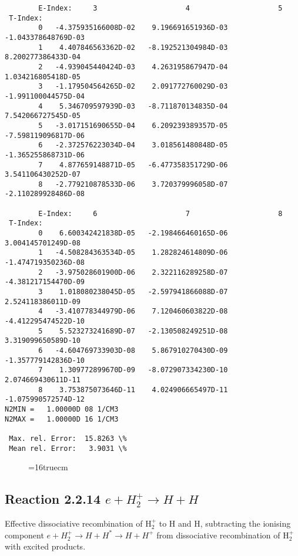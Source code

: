 \documentclass[12pt,dvipdfmx]{article}
\begin{document}
{\begin{small}
\begin{verbatim}
        E-Index:     3                     4                     5
 T-Index:
        0   -4.375935166008D-02    9.196691651936D-03   -1.043378648769D-03
        1    4.407846563362D-02   -8.192521304984D-03    8.200277386433D-04
        2   -4.939045440424D-03    4.263195867947D-04    1.034216805418D-05
        3   -1.179504564265D-02    2.091772760029D-03   -1.991100044575D-04
        4    5.346709597939D-03   -8.711870134835D-04    7.542066727545D-05
        5   -3.017151690655D-04    6.209239389357D-05   -7.598119096817D-06
        6   -2.372576223034D-04    3.018561480848D-05   -1.365255868731D-06
        7    4.877659148871D-05   -6.477358351729D-06    3.541106430252D-07
        8   -2.779210878533D-06    3.720379996058D-07   -2.110289928486D-08

        E-Index:     6                     7                     8
 T-Index:
        0    6.600342421838D-05   -2.198466460165D-06    3.004145701249D-08
        1   -4.508284363534D-05    1.282824614809D-06   -1.474719350236D-08
        2   -3.975028601900D-06    2.322116289258D-07   -4.381217154470D-09
        3    1.018080238045D-05   -2.597941866088D-07    2.524118386011D-09
        4   -3.410778344979D-06    7.120460603822D-08   -4.412295474522D-10
        5    5.523273241689D-07   -2.130508249251D-08    3.319099650589D-10
        6   -4.604769733903D-08    5.867910270430D-09   -1.357779142836D-10
        7    1.309772899670D-09   -8.072907334230D-10    2.074669430611D-11
        8    3.753875073646D-11    4.024906665497D-11   -1.075990572574D-12
N2MIN =   1.00000D 08 1/CM3
N2MAX =   1.00000D 16 1/CM3

 Max. rel. Error:  15.8263 \%
 Mean rel. Error:   3.9031 \%

\end{verbatim}\end{small}
\begin{figure} \label{2.2.12}
\epsfxsize=16truecm
\end{figure}
\newpage



\subsection{
Reaction 2.2.14  $ e + H_2^+    \rightarrow H + H  $
}
Effective dissociative recombination of H$_2^+$ to H and H, subtracting the
ionising component $e+H_2^+ \rightarrow H + H^* \rightarrow H + H^+$ from dissociative recombination of H$_2^+$ with excited products.


}
\end{document}
